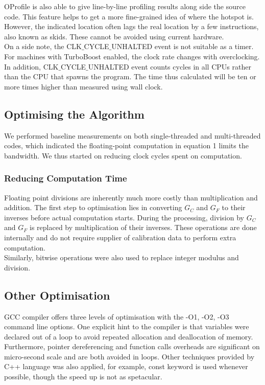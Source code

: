 \documentclass[journal]{IEEEtran}
\begin{document}
OProfile is also able to give line-by-line profiling results along side the source code. This feature helps to get a more fine-grained idea of where the hotspot is. However, the indicated location often lags the real location by a few instructions, also known as skids. These cannot be avoided using current hardware. \\

On a side note, the CLK$\_$CYCLE$\_$UNHALTED event is not suitable as a timer. For machines with TurboBoost enabled, the clock rate changes with overclocking. In addition, CLK$\_$CYCLE$\_$UNHALTED event counts cycles in all CPUs rather than the CPU that spawns the program. The time thus calculated will be ten or more times higher than measured using wall clock.  \\

\subsection{Optimising the Algorithm}
We performed baseline measurements on both single-threaded and multi-threaded codes, which indicated the floating-point computation in equation 1 limits the bandwidth. We thus started on reducing clock cycles spent on computation.
\subsubsection{Reducing Computation Time}
Floating point divisions are inherently much more costly than multiplication and addition. The first step to optimisation lies in converting $G_C$ and $G_F$ to their inverses before actual computation starts. During the processing, division by $G_C$ and $G_F$ is replaced by multiplication of their inverses. These operations are done internally and do not require supplier of calibration data to perform extra computation.\\
Similarly, bitwise operations were also used to replace integer modulus and division.\\

\subsection{Other Optimisation}
GCC compiler offers three levels of optimisation with the -O1, -O2, -O3 command line options. One explicit hint to the compiler is that variables were declared out of a loop to avoid repeated allocation and deallocation of memory. Furthermore, pointer dereferencing and function calls overheads are significant on micro-second scale and are both avoided in loops. Other techniques provided by C++ language was also applied, for example, const keyword is used whenever possible, though the speed up is not as spetacular. 
\end{document}
